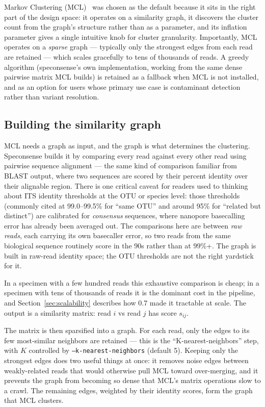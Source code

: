 \documentclass[11pt]{article}
\begin{document}
Markov Clustering (MCL)~\cite{vandongen2000} was chosen as the default because
it sits in the right part of the design space: it operates on a similarity
graph, it discovers the cluster count from the graph's structure rather than as
a parameter, and its inflation parameter gives a single intuitive knob for
cluster granularity. Importantly, MCL operates on a \emph{sparse} graph ---
typically only the strongest edges from each read are retained --- which
scales gracefully to tens of thousands of reads. A greedy algorithm
(speconsense's own implementation, working from the same dense pairwise
matrix MCL builds) is retained as a fallback when MCL is not installed,
and as an option for users whose primary use case is contaminant detection
rather than variant resolution.

\subsection{Building the similarity graph}
\label{sec:graph}

MCL needs a graph as input, and the graph is what determines the clustering.
Speconsense builds it by comparing every read against every other read using
pairwise sequence alignment --- the same kind of comparison familiar from
BLAST output, where two sequences are scored by their percent identity over
their alignable region. There is one critical caveat for readers used to
thinking about ITS identity thresholds at the OTU or species level: those
thresholds (commonly cited at 99.0--99.5\% for ``same OTU'' and around 95\%
for ``related but distinct'') are calibrated for \emph{consensus} sequences,
where nanopore basecalling error has already been averaged out. The
comparisons here are between \emph{raw reads}, each carrying its own
basecaller error, so two reads from the same biological sequence routinely
score in the 90s rather than at 99\%+. The graph is built in raw-read identity
space; the OTU thresholds are not the right yardstick for it.

In a specimen with a few hundred reads this exhaustive comparison is cheap; in
a specimen with tens of thousands of reads it is the dominant cost in the
pipeline, and Section~\ref{sec:scalability} describes how 0.7 made it
tractable at scale. The output is a similarity matrix: read $i$ vs read $j$
has score $s_{ij}$.

The matrix is then sparsified into a graph. For each read, only the edges to
its few most-similar neighbors are retained --- this is the
``K-nearest-neighbors'' step, with $K$ controlled by
\texttt{--k-nearest-neighbors} (default 5). Keeping only the strongest edges
does two useful things at once: it removes noise edges between weakly-related
reads that would otherwise pull MCL toward over-merging, and it prevents the
graph from becoming so dense that MCL's matrix operations slow to a crawl.
The remaining edges, weighted by their identity scores, form the graph that
MCL clusters.
\end{document}
